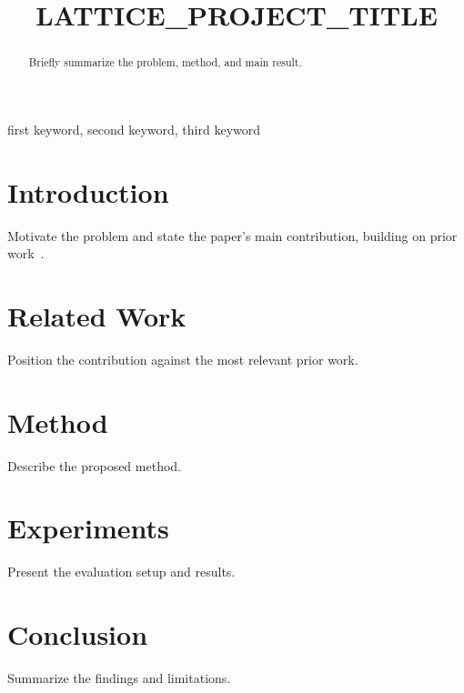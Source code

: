 \documentclass[conference]{IEEEtran}
\begin{document}
\title{LATTICE_PROJECT_TITLE}

\author{
}

\maketitle

\begin{abstract}
Briefly summarize the problem, method, and main result.
\end{abstract}

\begin{IEEEkeywords}
first keyword, second keyword, third keyword
\end{IEEEkeywords}

\section{Introduction}
Motivate the problem and state the paper's main contribution, building on
prior work~\cite{shell2015ieeetran,kopka2004guide}.

\section{Related Work}
Position the contribution against the most relevant prior work.

\section{Method}
Describe the proposed method.

\section{Experiments}
Present the evaluation setup and results.

\section{Conclusion}
Summarize the findings and limitations.



\end{document}
